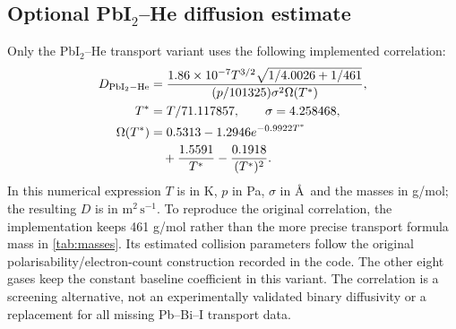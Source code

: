 \subsection{Optional \texorpdfstring{PbI$_2$}{PbI2}--He diffusion estimate}
Only the PbI$_2$--He transport variant uses the following implemented
correlation:
\begin{align}
 D_{\rm PbI_2-He}&=
 \frac{1.86\times10^{-7}T^{3/2}\sqrt{1/4.0026+1/461}}
 {(p/101325)\sigma^2\Omega(T^*)},\\
 T^*&=T/71.117857,\qquad \sigma=4.258468,\\
 \Omega(T^*)&=0.5313-1.2946e^{-0.9922T^*}\nonumber\\
             &\quad+\frac{1.5591}{T^*}-\frac{0.1918}{(T^*)^2}.
\end{align}
In this numerical expression $T$ is in K, $p$ in Pa, $\sigma$ in
\AA\ and the masses in g/mol; the resulting $D$ is in
$\mathrm{m^2\,s^{-1}}$. To reproduce the original correlation, the
implementation keeps 461 g/mol rather than the more precise transport
formula mass in \cref{tab:masses}. Its estimated collision parameters
follow the original polarisability/electron-count construction
recorded in the code. The other eight gases keep the constant baseline
coefficient in this variant. The correlation is a screening alternative,
not an experimentally validated binary diffusivity or a replacement
for all missing Pb--Bi--I transport data.

